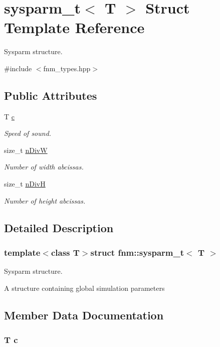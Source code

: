 \hypertarget{structfnm_1_1sysparm__t}{\section{sysparm\+\_\+t$<$ T $>$ Struct Template Reference}
\label{structfnm_1_1sysparm__t}
}


Sysparm structure.  




{\ttfamily \#include $<$fnm\+\_\+types.\+hpp$>$}

\subsection*{Public Attributes}
\begin{DoxyCompactItemize}
\item 
T \hyperlink{structfnm_1_1sysparm__t_a169228264adc1071b8585ae0c7f390cd}{c}
\begin{DoxyCompactList}\small\item\em Speed of sound. \end{DoxyCompactList}\item 
size\+\_\+t \hyperlink{structfnm_1_1sysparm__t_a676de84ecc719ad3223182fb136690af}{n\+Div\+W}
\begin{DoxyCompactList}\small\item\em Number of width abcissas. \end{DoxyCompactList}\item 
size\+\_\+t \hyperlink{structfnm_1_1sysparm__t_a26cce015a626b46108d07cdbab336011}{n\+Div\+H}
\begin{DoxyCompactList}\small\item\em Number of height abcissas. \end{DoxyCompactList}\end{DoxyCompactItemize}


\subsection{Detailed Description}
\subsubsection*{template$<$class T$>$struct fnm\+::sysparm\+\_\+t$<$ T $>$}

Sysparm structure. 

A structure containing global simulation parameters 

\subsection{Member Data Documentation}
\hypertarget{structfnm_1_1sysparm__t_a169228264adc1071b8585ae0c7f390cd}{
\subsubsection[{c}]{\setlength{\rightskip}{0pt plus 5cm}T c}}\label{structfnm_1_1sysparm__t_a169228264adc1071b8585ae0c7f390cd}


